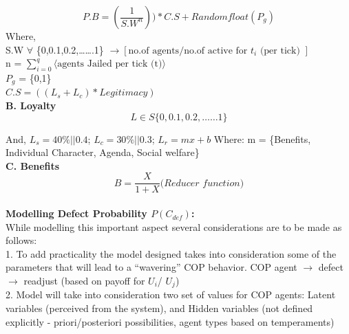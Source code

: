 \documentclass[a4paper,11pt]{article}
\begin{document}
\[P.B = \left(\frac{1}{S.W^n}\right)) * C.S + Random float (P_g) \]
Where,\\
S.W $\forall$ \{0,0.1,0.2,…….1\} $\longrightarrow [\text{no.of agents} / \text{no.of active for } t_i \text{ (per tick) }]$ \\
n = $\sum_{i=0}^q \langle \text{agents Jailed per tick (t)} \rangle$\\
$P_g$ = \{0,1\}  \\
$C.S = ((L_s + L_c) * Legitimacy)$\\
\textbf{B. Loyalty } 
\[L \in S \{0,0.1,0.2,……1\}	\]

And, $L_s = 40\% || 0.4 $; $L_c = 30\% || 0.3 $; $L_r = mx + b$ Where: m = \{Benefits, Individual Character, Agenda, Social welfare\}\\
\textbf{C. Benefits } 
\[B =   \frac{X}{1+X} \textit{(Reducer function)} \] \\
\textbf{Modelling Defect Probability $P(C_{def})$: } \\
While modelling this important aspect several considerations are to be made as follows: \\

1. To add practicality the model designed takes into consideration some of the parameters that will lead to a “wavering” COP behavior. COP agent $\longrightarrow$ defect $\longrightarrow$ readjust (based on payoff for $U_i$/ $U_j$) \\ %

2. Model will take into consideration two set of values for COP agents:
Latent variables (perceived from the system), and Hidden variables (not defined explicitly - priori/posteriori possibilities, agent types based on temperaments)\\ %
\end{document}
